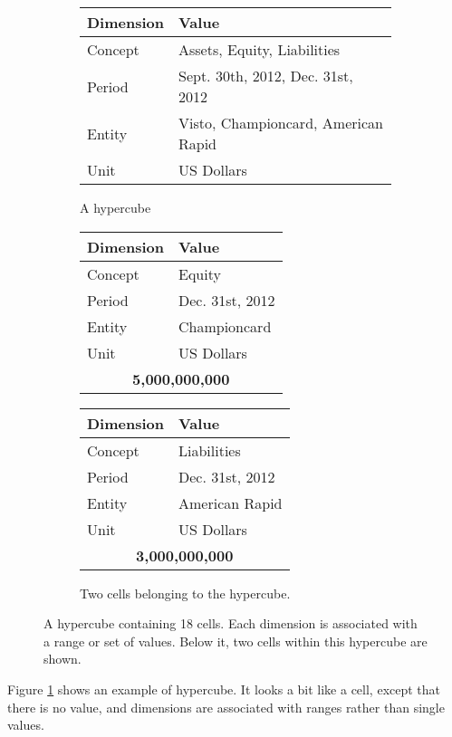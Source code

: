 \documentclass{acm_proc_article-sp}
\begin{document}
\begin{figure}
\centering
\begin{subfigure}[c]{\columnwidth}
\begin{tabular}{ll}
\hline
\hline
Dimension & Value \\
\hline
Concept & Assets, Equity, Liabilities \\
Period & Sept. 30th, 2012, Dec. 31st, 2012 \\
Entity & Visto, Championcard, American Rapid \\
Unit & US Dollars \\
\hline
\end{tabular}
\caption{A hypercube}
\end{subfigure}
\vspace{5pt}

\begin{subfigure}[c]{\columnwidth}
\centering
\begin{tabular}{ll}
\hline
\hline
Dimension & Value \\
\hline
Concept & Equity \\
Period & Dec. 31st, 2012 \\
Entity & Championcard \\
Unit & US Dollars \\
\hline
\multicolumn{2}{c}{\textbf{5,000,000,000}} \\
\hline
\end{tabular}
\vspace{10pt}
\begin{tabular}{ll}
\hline
\hline
Dimension & Value \\
\hline
Concept & Liabilities \\
Period & Dec. 31st, 2012 \\
Entity & American Rapid \\
Unit & US Dollars \\
\hline
\multicolumn{2}{c}{\textbf{3,000,000,000}} \\
\hline
\end{tabular}
\caption{Two cells belonging to the hypercube.}
\end{subfigure}
\vspace{5pt}
\caption{A hypercube containing 18 cells. Each dimension is associated with a range or set of values. Below it, two cells within this hypercube are shown.}
\label{fig-hypercube}
\end{figure}

Figure \ref{fig-hypercube} shows an example of hypercube. It looks a bit like a cell, except that there is no value, and dimensions are associated with ranges rather than single values.
\end{document}
